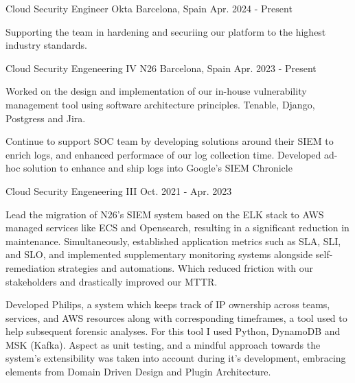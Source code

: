
\begin{cventries}
	\cventry
	{Cloud Security Engineer} %
	{Okta} %
	{Barcelona, Spain} %
	{Apr. 2024 - Present} %
	{
		\begin{cvitems} %
			\item {Supporting the team in hardening and securiing our platform to the highest industry standards.}
		\end{cvitems}
	}
	\cventry
	{Cloud Security Engeneering IV} %
	{N26} %
	{Barcelona, Spain} %
	{Apr. 2023 - Present} %
	{
		\begin{cvitems} %
            \item {Worked on the design and implementation of our in-house vulnerability management tool using software architecture principles. Tenable, Django, Postgress and Jira.}
			\item {Continue to support SOC team by developing solutions around their SIEM to enrich logs, and enhanced performace of our log collection time. Developed ad-hoc solution to enhance and ship logs into Google's SIEM Chronicle }
		\end{cvitems}
	}

	\cventry
	{Cloud Security Engeneering III} %
	{} %
	{} %
	{Oct. 2021 - Apr. 2023} %
	{
		\begin{cvitems} %
			\item {Lead the migration of N26's SIEM system based on the ELK stack to AWS managed services like ECS and Opensearch, resulting in a significant reduction in maintenance. Simultaneously, established application metrics such as SLA, SLI, and SLO, and implemented supplementary monitoring systems alongside self-remediation strategies and automations. Which reduced friction with our stakeholders and drastically improved our MTTR.}
			\item {Developed Philips, a system which keeps track of IP ownership across teams, services, and AWS resources along with corresponding timeframes, a tool used to help subsequent forensic analyses. For this tool I used Python, DynamoDB and MSK (Kafka). Aspect as unit testing, and a mindful approach towards the system's extensibility was taken into account during it's development, embracing elements from Domain Driven Design and Plugin Architecture.}
		\end{cvitems}
	}


\end{cventries}
